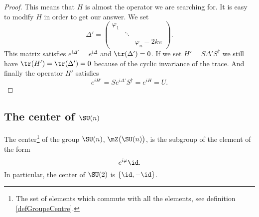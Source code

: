\begin{proof}
	This means that \( H\) is almost the operator we are searching for. It is easy to modify \( H\) in order to get our answer. We set
	\begin{equation}
		\Delta'=\begin{pmatrix}
			\varphi_1 &        &                 \\
			          & \ddots &                 \\
			          &        & \varphi_n-2k\pi
		\end{pmatrix}.
	\end{equation}
	This matrix satisfies \(   e^{i\Delta'}= e^{i\Delta}\) and \( \tr(\Delta')=0\). If we set \( H'=S\Delta'S^{\dag}\) we still have \( \tr(H')=\tr(\Delta')=0\) because of the cyclic invariance of the trace. And finally the operator \( H'\) satisfies
	\begin{equation}
		e^{iH'}=S e^{i\Delta'}S^{\dag}= e^{iH}=U.
	\end{equation}
\end{proof}

\subsection{The center of \texorpdfstring{$ \SU(n)$}{SUn} }

\begin{proposition}     \label{PROPooLMGHooKrKpsa}
	The center\footnote{The set of elements which commute with all the elements, see definition \ref{defGroupeCentre}.} of the group \( \SU(n)\), \( \mZ\big( \SU(n) \big)\), is the subgroup of the element of the form
	\begin{equation}
		e^{i\varphi}\id.
	\end{equation}
	In particular, the center of \( \SU(2)\) is \( \{ \id,-\id \}\).
\end{proposition}

